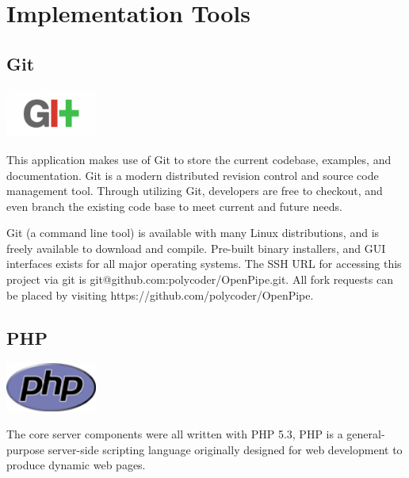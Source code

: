 \documentclass[12pt]{report}
\begin{document}

\chapter{Implementation Tools}

\section{Git}
\begin{center} 
\includegraphics[width=30mm]{figures/images/git_logo.png}
\end{center}

This application makes use of Git to store the current codebase, examples, and documentation. Git is a modern distributed revision control and source code management tool. Through utilizing Git, developers are free to checkout, and even branch the existing code base to meet current and future needs.

Git (a command line tool) is available with many Linux distributions, and is freely available to download and compile. Pre-built binary installers, and GUI interfaces exists for all major operating systems.  The SSH URL for accessing this project via git is git@github.com:polycoder/OpenPipe.git. All fork requests can be placed by visiting https://github.com/polycoder/OpenPipe.

\section{PHP}
\begin{center} 
\includegraphics[width=30mm]{figures/images/php_logo.png}
\end{center}

The core server components were all written with PHP 5.3, PHP is a general-purpose server-side scripting language originally designed for web development to produce dynamic web pages.
\end{document}
